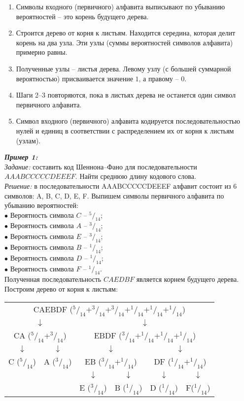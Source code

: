 \begin{enumerate}
\item Символы входного (первичного) алфавита выписывают по убыванию вероятностей -- это корень будущего дерева.
\item Строится дерево от корня к листьям. Находится середина, которая делит корень на два узла. Эти узлы (суммы вероятностей символов алфавита) примерно равны.
\item Полученные узлы -- листья дерева. Левому узлу (с большей суммарной вероятностью) присваивается значение $1$, а правому -- $0$.
\item Шаги 2--3 повторяются, пока в листьях дерева не останется один символ первичного алфавита.
\item Символ входного (первичного) алфавита кодируется последовательностью нулей и единиц в соответствии с распределением их от корня к листьям (узлам).
\end{enumerate}
\emph{\textbf{Пример 1:}}
\\\emph{Задание:} составить код Шеннона--Фано для последовательности
\\$AAABCCCCCDEEEF$. Найти среднюю длину кодового слова.
\\\emph{Решение:} в последовательности AAABCCCCCDEEEF алфавит состоит из 6 символов: A, B, C, D, E, F. Выпишем символы первичного алфавита по убыванию вероятностей:
\\$\bullet$ Вероятность символа $C$ -- $^5/_{14}$;
\\$\bullet$ Вероятность символа $A$ -- $^3/_{14}$;
\\$\bullet$ Вероятность символа $E$ -- $^3/_{14}$;
\\$\bullet$ Вероятность символа $B$ -- $^1/_{14}$;
\\$\bullet$ Вероятность символа $D$ -- $^1/_{14}$;
\\$\bullet$ Вероятность символа $F$ -- $^1/_{14}$.
\\Полученная последовательность $CAEDBF$ является корнем будущего дерева.
\\Построим дерево от корня к листьям:
\begin{table}[h]
\centering
\begin{tabular}{c c c c c c}
\multicolumn{6}{c}{CAEBDF ($^5/_{14} + ^3/_{14} + ^3/_{14} + ^1/_{14} + ^1/_{14} + ^1/_{14}$)} \\
\multicolumn{2}{c}{$\downarrow$} & \multicolumn{4}{c}{$\downarrow$} \\
\multicolumn{2}{c}{CA ($^5/_{14} + ^3/_{14}$)} & \multicolumn{4}{c}{EBDF ($^3/_{14} + ^1/_{14} + ^1/_{14} + ^1/_{14}$)} \\
$\downarrow$ & $\downarrow$ & \multicolumn{2}{c}{$\downarrow$} & \multicolumn{2}{c}{$\downarrow$} \\
C ($^5/_{14}$) & A ($^3/_{14}$) & \multicolumn{2}{c}{EB ($^3/_{14} + ^1/_{14}$)} & \multicolumn{2}{c}{DF ($^1/_{14} + ^1/_{14}$)} \\
 & & $\downarrow$ & $\downarrow$ & $\downarrow$ & $\downarrow$ \\
 & & E ($^3/_{14}$) & B ($^1/_{14}$) & D ($^1/_{14}$) & F($^1/_{14}$) \\
\end{tabular}
\end{table}
